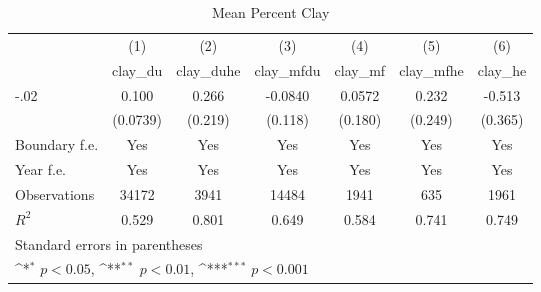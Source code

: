 \begin{table}[htbp]\centering
\def\sym#1{\ifmmode^{#1}\else\(^{#1}\)\fi}
\caption{Mean Percent Clay}
\begin{tabular}{l*{6}{c}}
\hline\hline
                    &\multicolumn{1}{c}{(1)}&\multicolumn{1}{c}{(2)}&\multicolumn{1}{c}{(3)}&\multicolumn{1}{c}{(4)}&\multicolumn{1}{c}{(5)}&\multicolumn{1}{c}{(6)}\\
                    &\multicolumn{1}{c}{clay\_du}&\multicolumn{1}{c}{clay\_duhe}&\multicolumn{1}{c}{clay\_mfdu}&\multicolumn{1}{c}{clay\_mf}&\multicolumn{1}{c}{clay\_mfhe}&\multicolumn{1}{c}{clay\_he}\\
\hline
-.02                &       0.100         &       0.266         &     -0.0840         &      0.0572         &       0.232         &      -0.513         \\
                    &    (0.0739)         &     (0.219)         &     (0.118)         &     (0.180)         &     (0.249)         &     (0.365)         \\
[1em]
Boundary f.e.       &         Yes         &         Yes         &         Yes         &         Yes         &         Yes         &         Yes         \\
[1em]
Year f.e.           &         Yes         &         Yes         &         Yes         &         Yes         &         Yes         &         Yes         \\
\hline
Observations        &       34172         &        3941         &       14484         &        1941         &         635         &        1961         \\
\(R^{2}\)           &       0.529         &       0.801         &       0.649         &       0.584         &       0.741         &       0.749         \\
\hline\hline
\multicolumn{7}{l}{\footnotesize Standard errors in parentheses}\\
\multicolumn{7}{l}{\footnotesize \sym{*} \(p<0.05\), \sym{**} \(p<0.01\), \sym{***} \(p<0.001\)}\\
\end{tabular}
\end{table}
